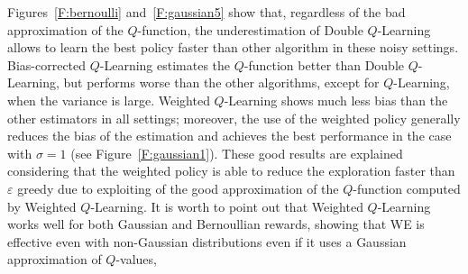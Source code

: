 Figures~\ref{F:bernoulli} and~\ref{F:gaussian5} show that, regardless of the bad approximation of the $Q$-function, the underestimation of Double $Q$-Learning allows to learn the best policy faster than other algorithm in these noisy settings.
Bias-corrected $Q$-Learning estimates the $Q$-function better than Double $Q$-Learning, but performs worse than the other algorithms, except for $Q$-Learning, when the variance is large.
Weighted $Q$-Learning shows much less bias than the other estimators in all settings; moreover, the use of the weighted policy generally reduces the bias of the estimation and achieves the best performance in the case with $\sigma = 1$ (see Figure~\ref{F:gaussian1}). These good results are explained considering that the weighted policy is able to reduce the exploration faster than $\varepsilon$ greedy due to exploiting of the good approximation of the $Q$-function computed by Weighted $Q$-Learning. It is worth to point out that Weighted $Q$-Learning works well for both Gaussian and Bernoullian rewards, showing that WE is effective even with non-Gaussian distributions even if it uses a Gaussian approximation of $Q$-values,

